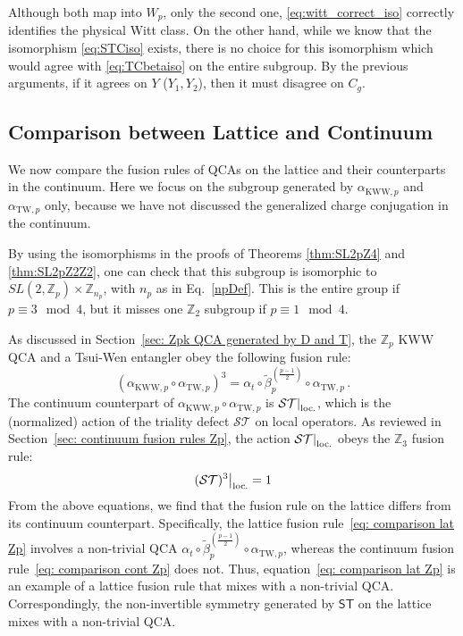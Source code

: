 \documentclass[aps,twocolumn,prx,floatfix,preprintnumbers, nofootinbib,10pt]{revtex4-2}
\numberwithin{equation}{section}
\theoremstyle{definition}
\theoremstyle{remark}
\theoremstyle{claim}
\newcommand{\be}{\begin{equation}}
\newcommand{\ee}{\end{equation}}
\newcommand{\aKWWp}{\alpha_{\text{KWW},p}}
\newcommand{\aTWp}{\alpha_{\text{TW},p}}
\newcommand{\Z}{{\mathbb Z}}
\newcommand{\mc}[1]{\mathcal{#1}}
\newcommand\restr[2]{{%
  \left.\kern-\nulldelimiterspace %
  #1 %
  \right|_{#2} %
}}
\newcommand{\opaction}[1]{\restr{#1}{\text{loc.}}}
\begin{document}
Although both map into $W_p$, only the second one, \eqref{eq:witt_correct_iso} correctly identifies the physical Witt class.
On the other hand, while we know that the isomorphism \eqref{eq:STCiso} exists, there is no choice for this isomorphism which would agree with \eqref{eq:TCbetaiso} on the entire subgroup. By the previous arguments, if it agrees on $Y$ ($Y_1, Y_2$), then it must disagree on $C_g$.

\subsection{Comparison between Lattice and Continuum}
\label{sec: comparison Zp}
We now compare the fusion rules of QCAs on the lattice and their counterparts in the continuum. Here we focus on the subgroup generated by $\aKWWp$ and $\aTWp$ only, because we have not discussed the generalized charge conjugation in the continuum.

By using the isomorphisms in the proofs of Theorems \ref{thm:SL2pZ4} and \ref{thm:SL2pZ2Z2}, one can check that this subgroup is isomorphic to $SL(2, \Z_p) \times \Z_{n_p}$, with $n_p$ as in Eq.~\eqref{npDef}. This is the entire group if $p \equiv 3 \mod 4$, but it misses one $\Z_2$ subgroup if $p \equiv 1 \mod 4$.

As discussed in Section~\ref{sec: Zpk QCA generated by D and T}, the $\mathbb{Z}_p$ KWW QCA and a Tsui-Wen entangler obey the following fusion rule:
\begin{equation}
\left(\aKWWp \circ \aTWp\right)^3 = \alpha_t \circ \tilde{\beta}_p^{\left( \frac{p-1}{2} \right)} \circ \aTWp \,.
\label{eq: comparison lat Zp}
\end{equation}
The continuum counterpart of $\aKWWp \circ \aTWp$ is $\opaction{\mathcal{ST}}$, which is the (normalized) action of the triality defect $\mathcal{ST}$ on local operators.
As reviewed in Section~\ref{sec: continuum fusion rules Zp}, the action $\opaction{\mathcal{ST}}$ obeys the $\mathbb{Z}_3$ fusion rule:
\be\label{eq: comparison cont Zp}
\opaction{(\mc{ST})^3} = 1
\ee
From the above equations, we find that the fusion rule on the lattice differs from its continuum counterpart.
Specifically, the lattice fusion rule~\eqref{eq: comparison lat Zp} involves a non-trivial QCA $\alpha_t \circ \tilde{\beta}_p^{\left( \frac{p-1}{2} \right)} \circ \aTWp$, whereas the continuum fusion rule~\eqref{eq: comparison cont Zp} does not.
Thus, equation~\eqref{eq: comparison lat Zp} is an example of a lattice fusion rule that mixes with a non-trivial QCA.
Correspondingly, the non-invertible symmetry generated by $\mathsf{ST}$ on the lattice mixes with a non-trivial QCA.
\end{document}
